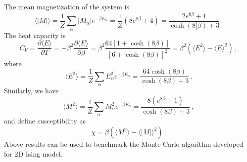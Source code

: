 The mean magnetization of the system is 
\begin{equation}
\langle|M|\rangle=\frac{1}{Z}\sum_{\alpha} |M_\alpha| e^{-\beta E_\alpha}=\frac{1}{Z}\left(8e^{8\beta}+4\right)
=\frac{2e^{8\beta}+1}{\cosh\left(8]\beta\right)+3}\,. 
\end{equation}
The heat capacity is 
\begin{equation}\label{eq:cv}
C_V=\frac{\partial \langle E\rangle}{\partial T}=-\beta^2\frac{\partial \langle E\rangle}{\partial \beta}
=\beta^2\frac{64\left[1+\cosh\left(8\beta\right)\right]}{\left[6+\cosh\left(8\beta\right)\right]^2}
=\beta^2\left(\langle E^2\rangle-\langle E\rangle^2\right)\,,
\end{equation}
where 
\begin{equation}
\langle E^2\rangle=\frac{1}{Z}\sum_{\alpha}E^2_\alpha e^{-\beta E_\alpha}=\frac{64\cosh\left(8\beta\right)}{\cosh\left(8\beta\right)+3}\,. 
\end{equation}
Similarly, we have 
\begin{equation}
\langle M^2\rangle=\frac{1}{Z}\sum_{\alpha} M^2_\alpha e^{-\beta E_\alpha}=\frac{8\left(e^{8\beta}+1\right)}{\cosh\left(8\beta\right)+3}\,, 
\end{equation}
and define susceptibility as 
\begin{equation}\label{eq:chi}
\chi=\beta\left(\langle M^2\rangle -\langle |M|\rangle ^2\right)\,. 
\end{equation}
Above results can be used to benchmark the Monte Carlo algorithm developed for 2D Ising model. 

